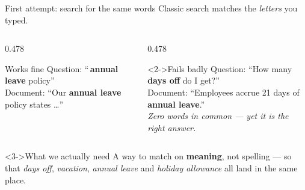 \documentclass[aspectratio=169,11pt]{beamer}
\begin{document}
\begin{frame}{First attempt: search for the same words}
  Classic search matches the \emph{letters} you typed.
  \bigskip
  \begin{columns}[T,onlytextwidth]
    \begin{column}{0.478\textwidth}
      \begin{exampleblock}{Works fine}
        Question: ``\,\textbf{annual leave} policy''\\
        Document: ``Our \textbf{annual leave} policy states \dots''
      \end{exampleblock}
    \end{column}
    \begin{column}{0.478\textwidth}
      \begin{alertblock}<2->{Fails badly}
        Question: ``How many \textbf{days off} do I get?''\\
        Document: ``Employees accrue 21 days of \textbf{annual leave}.''\\
        \smallskip
        \emph{Zero words in common --- yet it is the right answer.}
      \end{alertblock}
    \end{column}
  \end{columns}
  \bigskip
  \begin{block}<3->{What we actually need}
    A way to match on \textbf{meaning}, not spelling --- so that
    \emph{days off}, \emph{vacation}, \emph{annual leave} and \emph{holiday
    allowance} all land in the same place.
  \end{block}
\end{frame}
\end{document}
